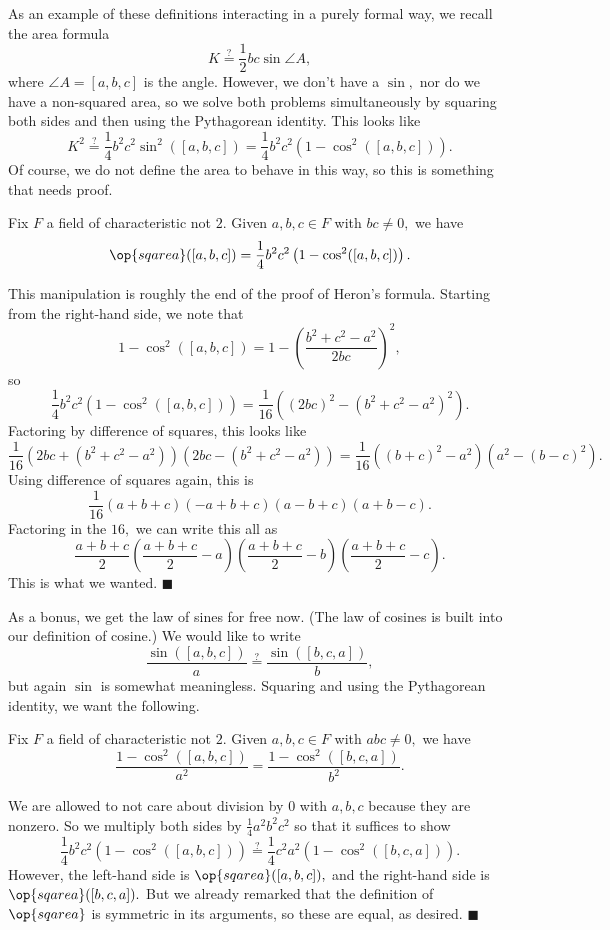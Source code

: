 As an example of these definitions interacting in a purely formal way, we recall the area formula
\[K\stackrel?=\frac12bc\sin\angle A,\]
where $\angle A=[a,b,c]$ is the angle. However, we don't have a $\sin,$ nor do we have a non-squared area, so we solve both problems simultaneously by squaring both sides and then using the Pythagorean identity. This looks like
\[K^2\stackrel?=\frac14b^2c^2\sin^2([a,b,c])=\frac14b^2c^2\left(1-\cos^2([a,b,c])\right).\]
Of course, we do not define the area to behave in this way, so this is something that needs proof.
\begin{proposition}
    Fix $F$ a field of characteristic not $2.$ Given $a,b,c\in F$ with $bc\ne0,$ we have
    \[\op{sqarea}([a,b,c])=\frac14b^2c^2\left(1-\cos^2([a,b,c])\right).\]
\end{proposition}
This manipulation is roughly the end of the proof of Heron's formula. Starting from the right-hand side, we note that
\[1-\cos^2([a,b,c])=1-\left(\frac{b^2+c^2-a^2}{2bc}\right)^2,\]
so
\[\frac14b^2c^2\left(1-\cos^2([a,b,c])\right)=\frac1{16}\left((2bc)^2-\left(b^2+c^2-a^2\right)^2\right).\]
Factoring by difference of squares, this looks like
\[\frac1{16}\left(2bc+\left(b^2+c^2-a^2\right)\right)\left(2bc-\left(b^2+c^2-a^2\right)\right)=\frac1{16}\left((b+c)^2-a^2\right)\left(a^2-(b-c)^2\right).\]
Using difference of squares again, this is
\[\frac1{16}(a+b+c)(-a+b+c)(a-b+c)(a+b-c).\]
Factoring in the $16,$ we can write this all as
\[\frac{a+b+c}2\left(\frac{a+b+c}2-a\right)\left(\frac{a+b+c}2-b\right)\left(\frac{a+b+c}2-c\right).\]
This is what we wanted. $\blacksquare$

As a bonus, we get the law of sines for free now. (The law of cosines is built into our definition of cosine.) We would like to write
\[\frac{\sin([a,b,c])}a\stackrel?=\frac{\sin([b,c,a])}b,\]
but again $\sin$ is somewhat meaningless. Squaring and using the Pythagorean identity, we want the following.
\begin{proposition}
    Fix $F$ a field of characteristic not $2.$ Given $a,b,c\in F$ with $abc\ne0,$ we have
    \[\frac{1-\cos^2([a,b,c])}{a^2}=\frac{1-\cos^2([b,c,a])}{b^2}.\]
\end{proposition}
We are allowed to not care about division by $0$ with $a,b,c$ because they are nonzero. So we multiply both sides by $\frac14a^2b^2c^2$ so that it suffices to show
\[\frac14b^2c^2\left(1-\cos^2([a,b,c])\right)\stackrel?=\frac14c^2a^2\left(1-\cos^2([b,c,a])\right).\]
However, the left-hand side is $\op{sqarea}([a,b,c]),$ and the right-hand side is $\op{sqarea}([b,c,a]).$ But we already remarked that the definition of $\op{sqarea}$ is symmetric in its arguments, so these are equal, as desired. $\blacksquare$

